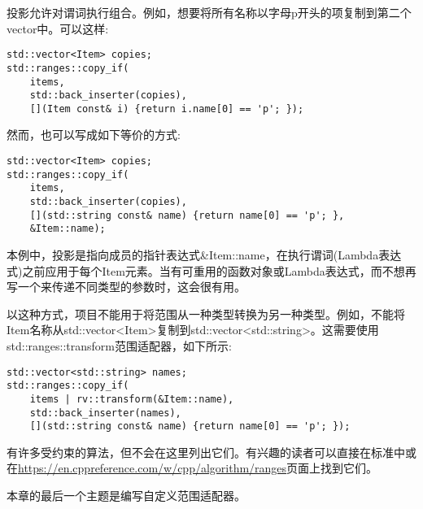投影允许对谓词执行组合。例如，想要将所有名称以字母p开头的项复制到第二个vector中。可以这样:

\begin{lstlisting}[style=styleCXX]
std::vector<Item> copies;
std::ranges::copy_if(
	items,
	std::back_inserter(copies),
	[](Item const& i) {return i.name[0] == 'p'; });
\end{lstlisting}

然而，也可以写成如下等价的方式:

\begin{lstlisting}[style=styleCXX]
std::vector<Item> copies;
std::ranges::copy_if(
	items,
	std::back_inserter(copies),
	[](std::string const& name) {return name[0] == 'p'; },
	&Item::name);
\end{lstlisting}

本例中，投影是指向成员的指针表达式\&Item::name，在执行谓词(Lambda表达式)之前应用于每个Item元素。当有可重用的函数对象或Lambda表达式，而不想再写一个来传递不同类型的参数时，这会很有用。

以这种方式，项目不能用于将范围从一种类型转换为另一种类型。例如，不能将Item名称从std::vector<Item>复制到std::vector<std::string>。这需要使用std::ranges::transform范围适配器，如下所示:

\begin{lstlisting}[style=styleCXX]
std::vector<std::string> names;
std::ranges::copy_if(
	items | rv::transform(&Item::name),
	std::back_inserter(names),
	[](std::string const& name) {return name[0] == 'p'; });
\end{lstlisting}

有许多受约束的算法，但不会在这里列出它们。有兴趣的读者可以直接在标准中或在\url{https://en.cppreference.com/w/cpp/algorithm/ranges}页面上找到它们。

本章的最后一个主题是编写自定义范围适配器。




























